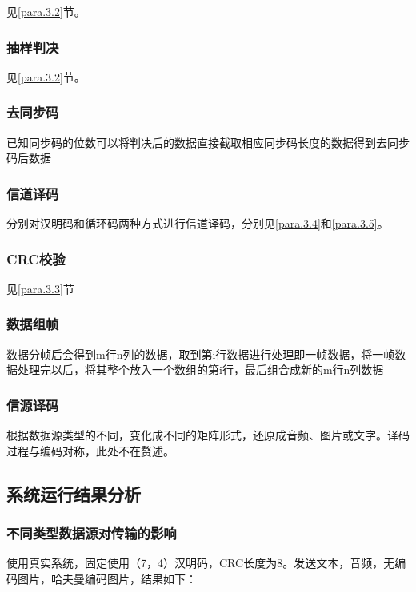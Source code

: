 \documentclass[UTF8]{ctexart}
\begin{document}
见\ref{para.3.2}节。

\subsubsection{抽样判决}

见\ref{para.3.2}节。

\subsubsection{去同步码}

已知同步码的位数可以将判决后的数据直接截取相应同步码长度的数据得到去同步码后数据

\subsubsection{信道译码}
分别对汉明码和循环码两种方式进行信道译码，分别见\ref{para.3.4}和\ref{para.3.5}。

\subsubsection{CRC校验}

见\ref{para.3.3}节

\subsubsection{数据组帧}

数据分帧后会得到m行n列的数据，取到第i行数据进行处理即一帧数据，将一帧数据处理完以后，将其整个放入一个数组的第i行，最后组合成新的m行n列数据

\subsubsection{信源译码}

根据数据源类型的不同，变化成不同的矩阵形式，还原成音频、图片或文字。译码过程与编码对称，此处不在赘述。

\subsection{系统运行结果分析}

\subsubsection{不同类型数据源对传输的影响}

使用真实系统，固定使用（7，4）汉明码，CRC长度为8。发送文本，音频，无编码图片，哈夫曼编码图片，结果如下：
\end{document}
